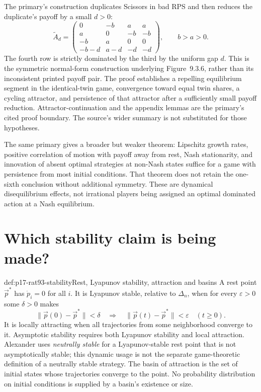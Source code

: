The primary's construction duplicates Scissors in bad RPS and then
reduces the duplicate's payoff by a small \(d>0\):
\[
 \widetilde A_d=
 \begin{pmatrix}
 0&-b&a&a\\ a&0&-b&-b\\ -b&a&0&0\\
 -b-d&a-d&-d&-d
 \end{pmatrix},\qquad b>a>0.
\]
The fourth row is strictly dominated by the third by the uniform gap
\(d\). This is the symmetric normal-form construction underlying
Figure~9.3.6, rather than its inconsistent printed payoff pair.
The proof establishes a repelling equilibrium segment in the identical-twin
game, convergence toward equal twin shares, a cycling attractor, and
persistence of that attractor after a sufficiently small payoff reduction.
Attractor-continuation and the appendix lemmas are the primary's cited
proof boundary. The source's wider summary is not substituted for those
hypotheses. \cite[Sec.~3, Theorem~1 and note~6, pp.~346--351]{HofbauerSandholm2011Survival}

The same primary gives a broader but weaker theorem: Lipschitz
growth rates, positive correlation of motion with payoff away from
rest, Nash stationarity, and innovation of absent optimal strategies
at non-Nash states suffice for a game with persistence from most initial
conditions. That theorem does not retain the one-sixth conclusion
without additional symmetry. These are dynamical disequilibrium effects,
not irrational players being assigned an optimal dominated action at
a Nash equilibrium. \cite[Sec.~4.1, Theorem~2, pp.~351--353]{HofbauerSandholm2011Survival}

\section{Which stability claim is being made?}
\label{sec:p17-rat93-stability}

\begin{hbdefinition}{def:p17-rat93-stability}{Rest, Lyapunov stability, attraction and basins}
A rest point \(\vec p^*\) has \(\dot p_i=0\) for all \(i\).
It is Lyapunov stable, relative to \(\Delta_n\), when for every
\(\varepsilon>0\) some \(\delta>0\) makes
\[
 \lVert\vec p(0)-\vec p^*\rVert<\delta
 \quad\Longrightarrow\quad
 \lVert\vec p(t)-\vec p^*\rVert<\varepsilon\quad(t\geq0).
\]
It is locally attracting when all trajectories from some neighborhood
converge to it. Asymptotic stability requires both Lyapunov stability
and local attraction. Alexander uses \emph{neutrally stable} for a
Lyapunov-stable rest point that is not asymptotically stable; this
dynamic usage is not the separate game-theoretic definition of a
neutrally stable strategy. The basin of attraction is the set of
initial states whose trajectories converge to the point.
No probability distribution on initial conditions is supplied by a
basin's existence or size.
\end{hbdefinition}

